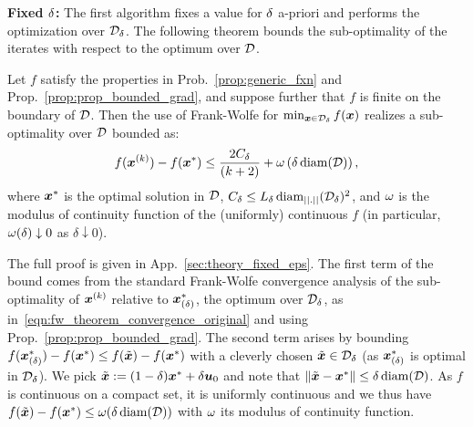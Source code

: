 \textbf{Fixed $\delta$:}
The first algorithm fixes a value for $\delta$ a-priori
and performs the optimization over $\mathcal{D}_{\delta}$. 
%
%
The following theorem bounds the 
sub-optimality of the iterates with respect to the optimum over $\mathcal{D}$. 

\begin{theorem}
	\label{thm:convergence_fixed_eps_main}
	Let $f$ satisfy the properties in Prob.~\ref{prop:generic_fxn} and Prop.~\ref{prop:prop_bounded_grad}, and suppose further that $f$ is finite on the boundary of $\mathcal{D}$. 
	Then the use of Frank-Wolfe for $\min_{\bm{x}\in\mathcal{D}_{\delta}} f(\bm{x})$ realizes a sub-optimality over $\mathcal{D}$ bounded as:
	$$f(\bm{x}^{(k)})-f(\bm{x}^{*})\leq
        \frac{2C_{\delta}}{(k+2)}+\omega \left( \delta \operatorname{diam}(\mathcal{D})\right),$$ 
        where $\bm{x}^{*}$ is the optimal
        solution in $\mathcal{D}$, $C_{\delta} \leq 
        L_{\delta} \operatorname{diam}_{||.||}(\mathcal{D}_{\delta})^2 $, and $\omega$
        is the modulus of continuity function of the (uniformly) continuous $f$ (in particular, $\omega(\delta) \downarrow 0$ as $\delta \downarrow 0$).
\end{theorem}
%
The full proof is given in App.~\ref{sec:theory_fixed_eps}.
The first term of the bound
comes from the standard Frank-Wolfe convergence analysis of the
sub-optimality of $\bm{x}^{(k)}$ relative to $\bm{x}^{*}_{(\delta)}$, the optimum over $\mathcal{D}_{\delta}$, as in~\eqref{eqn:fw_theorem_convergence_original} and using Prop.~\ref{prop:prop_bounded_grad}.
The second term arises by bounding $f(\bm{x}^{*}_{(\delta)}) - f(\bm{x}^*) \leq f(\tilde{\bm{x}}) - f(\bm{x}^*)$ with 
a cleverly chosen $\tilde{\bm{x}} \in \mathcal{D}_{\delta}$ (as $\bm{x}^{*}_{(\delta)}$ is optimal in $\mathcal{D}_{\delta}$). We pick 
$\tilde{\bm{x}} := (1-\delta) \bm{x}^* + \delta \bm{u}_0$ and note that $\|\tilde{\bm{x}} - \bm{x}^*\| \leq \delta \operatorname{diam}(\mathcal{D})$. As $f$ is continuous on a compact set, it is uniformly continuous 
and we thus have $f(\tilde{\bm{x}}) - f(\bm{x}^*) \leq \omega (\delta \operatorname{diam}(\mathcal{D}))$ with $\omega$ its modulus of continuity function.

